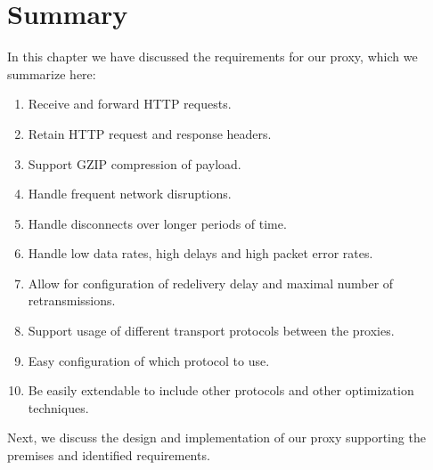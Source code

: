 \section{Summary}
\label{section:requirements-summary}

In this chapter we have discussed the requirements for our proxy, which we
summarize here:

\begin{enumerate}
    \item Receive and forward HTTP requests.
    \item Retain HTTP request and response headers.
    \item Support GZIP compression of payload.
    \item Handle frequent network disruptions.
    \item Handle disconnects over longer periods of time.
    \item Handle low data rates, high delays and high packet error rates.
    \item Allow for configuration of redelivery delay and maximal number of retransmissions.
    \item Support usage of different transport protocols between the proxies.
    \item Easy configuration of which protocol to use.
    \item Be easily extendable to include other protocols and other optimization techniques.
\end{enumerate}

Next, we discuss the design and implementation of our proxy supporting the
premises and identified requirements.
